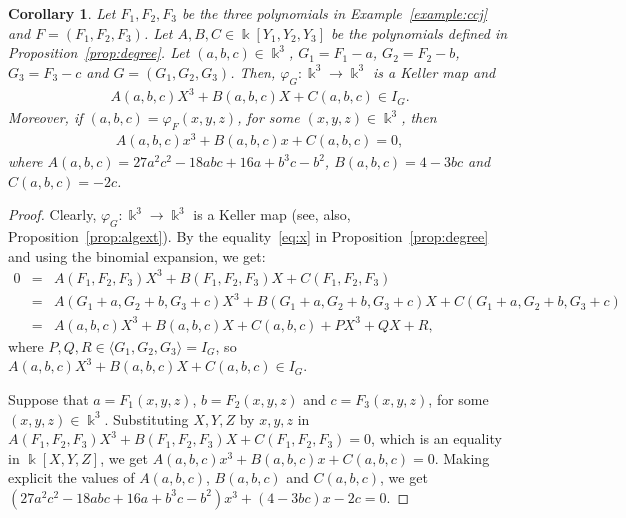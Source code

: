 \documentclass[11pt,reqno]{amsart}
\newtheorem{corollary}[theorem]{Corollary}
\theoremstyle{definition}
\newcommand{\mbk}{\mbox{$\Bbbk$}}
\begin{document}
\begin{corollary}\label{cor:inIG}
Let $F_1,F_2,F_3$ be the three polynomials in {\rm Example~\ref{example:ccj}} and $F=(F_1,F_2,F_3)$. 
Let $A,B,C\in\mbk[Y_1,Y_2,Y_3]$ be the polynomials defined in {\rm Proposition~\ref{prop:degree}}.
Let $(a,b,c)\in\mbk^3$, $G_1=F_1-a$, $G_2=F_2-b$, $G_3=F_3-c$ and $G=(G_1,G_2,G_3)$. 
Then, $\varphi_G:\mbk^3\to \mbk^3$ is a Keller map and 
\begin{eqnarray}\label{eq:belongIF}
A(a,b,c)X^3+B(a,b,c)X+C(a,b,c)\in I_G.
\end{eqnarray}
Moreover, if $(a,b,c)=\varphi_F(x,y,z)$, for some $(x,y,z)\in\mbk^3$, then 
\begin{eqnarray}\label{eq:resultant}
A(a,b,c)x^3+B(a,b,c)x+C(a,b,c)=0,
\end{eqnarray}
where $A(a,b,c)=27a^2c^2-18abc+16a+b^3c-b^2$, $B(a,b,c)=4-3bc$ and $C(a,b,c)=-2c$.
\end{corollary}
\begin{proof}
Clearly, $\varphi_G:\mbk^3\to\mbk^3$ is a Keller map (see, also, Proposition~\ref{prop:algext}). By the equality~\eqref{eq:x} in Proposition~\ref{prop:degree} and using the binomial expansion, we get:
\begin{eqnarray*}
0&=&A(F_1,F_2,F_3)X^3+B(F_1,F_2,F_3)X+C(F_1,F_2,F_3)\\
&=&A(G_1+a,G_2+b,G_3+c)X^3+B(G_1+a,G_2+b,G_3+c)X+C(G_1+a,G_2+b,G_3+c)\\
&=&A(a,b,c)X^3+B(a,b,c)X+C(a,b,c)+PX^3+QX+R,
\end{eqnarray*}
where $P,Q,R\in\langle G_1,G_2,G_3\rangle=I_G$, so 
$A(a,b,c)X^3+B(a,b,c)X+C(a,b,c)\in I_G$.

Suppose that $a=F_1(x,y,z)$, $b=F_2(x,y,z)$ and $c=F_3(x,y,z)$, for some $(x,y,z)\in\mbk^3$. Substituting $X,Y,Z$ by $x,y,z$ in 
$A(F_1,F_2,F_3)X^3+B(F_1,F_2,F_3)X+C(F_1,F_2,F_3)=0$, which is an equality in $\mbk[X,Y,Z]$, we get $A(a,b,c)x^3+B(a,b,c)x+C(a,b,c)=0$. Making explicit the values of
$A(a,b,c)$, $B(a,b,c)$ and $C(a,b,c)$, we get
$(27a^2c^2-18abc+16a+b^3c-b^2)x^3+(4-3bc)x-2c=0$.
\end{proof}
\end{document}
